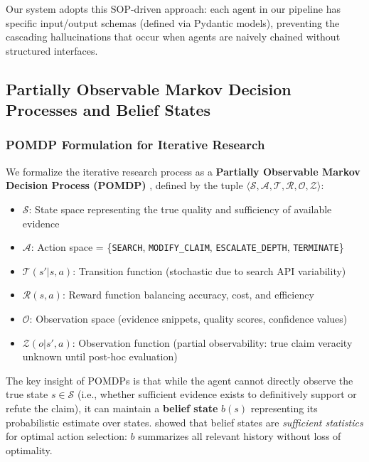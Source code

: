 Our system adopts this SOP-driven approach: each agent in our pipeline has specific input/output schemas (defined via Pydantic models), preventing the cascading hallucinations that occur when agents are naively chained without structured interfaces.

\subsection{Partially Observable Markov Decision Processes and Belief States}

\subsubsection{POMDP Formulation for Iterative Research}

We formalize the iterative research process as a \textbf{Partially Observable Markov Decision Process (POMDP)} \citep{pomdp_primer, pomdp_tutorial}, defined by the tuple $\langle \mathcal{S}, \mathcal{A}, \mathcal{T}, \mathcal{R}, \mathcal{O}, \mathcal{Z} \rangle$:

\begin{itemize}
    \item $\mathcal{S}$: State space representing the true quality and sufficiency of available evidence
    \item $\mathcal{A}$: Action space = \{\texttt{SEARCH}, \texttt{MODIFY\_CLAIM}, \texttt{ESCALATE\_DEPTH}, \texttt{TERMINATE}\}
    \item $\mathcal{T}(s' | s, a)$: Transition function (stochastic due to search API variability)
    \item $\mathcal{R}(s, a)$: Reward function balancing accuracy, cost, and efficiency
    \item $\mathcal{O}$: Observation space (evidence snippets, quality scores, confidence values)
    \item $\mathcal{Z}(o | s', a)$: Observation function (partial observability: true claim veracity unknown until post-hoc evaluation)
\end{itemize}

The key insight of POMDPs is that while the agent cannot directly observe the true state $s \in \mathcal{S}$ (i.e., whether sufficient evidence exists to definitively support or refute the claim), it can maintain a \textbf{belief state} $b(s)$ representing its probabilistic estimate over states. \citet{pomdp_tutorial} showed that belief states are \textit{sufficient statistics} for optimal action selection: $b$ summarizes all relevant history without loss of optimality.

